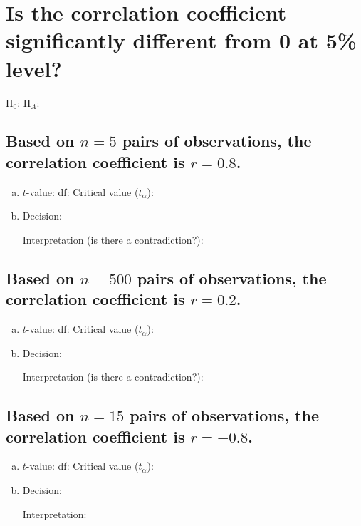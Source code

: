 \section{Is the correlation coefficient significantly different from 0 at 5\% level?}

 H$_0$: \hrulefill\quad H$_A$: \hrulefill		
\subsection{Based on $n = 5$ pairs of observations, the correlation coefficient is $r = 0.8$.}
\begin{enumerate}[a)]
\item $t$-value: \hrulefill\quad df:	\hrulefill	 \quad Critical value ($t_\alpha$): 	\hrulefill	
\item Decision: \hrulefill

	Interpretation (is there a contradiction?): \hrulefill
\end{enumerate}

\subsection{Based on $n = 500$ pairs of observations, the correlation coefficient is $r = 0.2$.}
\begin{enumerate}[a)]
\item $t$-value: \hrulefill\quad df:	\hrulefill	 \quad Critical value ($t_\alpha$): 	\hrulefill	
\item Decision: \hrulefill

	 Interpretation (is there a contradiction?): \hrulefill
\end{enumerate}

\subsection{Based on $n = 15$ pairs of observations, the correlation coefficient is $r = -0.8$.}

\begin{enumerate}[a)]
\item $t$-value: \hrulefill\quad df:	\hrulefill	 \quad Critical value ($t_\alpha$): 	\hrulefill	
\item Decision: \hrulefill

 Interpretation: \hrulefill
\end{enumerate}

